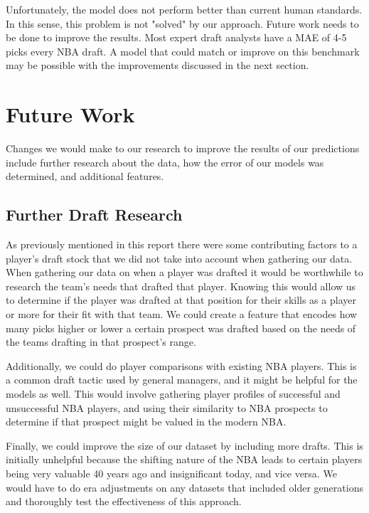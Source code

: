 \documentclass{article}
\begin{document}
Unfortunately, the model does not perform better than current human standards.
In this sense, this problem is not "solved" by our approach. Future work needs
to be done to improve the results. Most expert draft analysts have a MAE of 4-5
picks every NBA draft. A model that could match or improve on this benchmark may
be possible with the improvements discussed in the next section.

\section{Future Work}

Changes we would make to our research to improve the results of our predictions
include further research about the data, how the error of our models was
determined, and additional features.

\subsection{Further Draft Research}

As previously mentioned in this report there were some contributing factors to a
player’s draft stock that we did not take into account when gathering our data.
When gathering our data on when a player was drafted it would be worthwhile to
research the team’s needs that drafted that player. Knowing this would allow us
to determine if the player was drafted at that position for their skills as a
player or more for their fit with that team. We could create a feature that
encodes how many picks higher or lower a certain prospect was drafted based on
the needs of the teams drafting in that prospect's range.

Additionally, we could do player comparisons with existing NBA players. This is
a common draft tactic used by general managers, and it might be helpful for the
models as well. This would involve gathering player profiles of successful and
unsuccessful NBA players, and using their similarity to NBA prospects to
determine if that prospect might be valued in the modern NBA.

Finally, we could improve the size of our dataset by including more drafts. This
is initially unhelpful because the shifting nature of the NBA leads to certain
players being very valuable 40 years ago and insignificant today, and vice
versa. We would have to do era adjustments on any datasets that included older
generations and thoroughly test the effectiveness of this approach.
\end{document}
